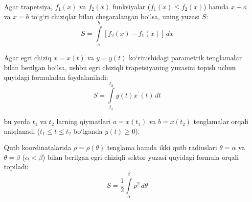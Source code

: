 Agar trapetsiya, $f_1(x)$ va $f_2(x)$ funksiyalar ($f_1(x)\le f_2(x)$) hamda $x+a$ va $x=b$ to`g`ri chiziqlar bilan chegaralangan bo`lsa, uning yuzasi $S$:
$$S=\int\limits_a^b\left[f_2(x)-f_1(x)\right]\,dx$$

Agar egri chiziq $x=x(t)$ va $y=y(t)$ ko`rinishidagi parametrik tenglamalar bilan berilgan bo`lsa, ushbu egri chiziqli trapetsiyaning yuzasini topish uchun quyidagi formuladan foydalaniladi:
$$S=\int\limits_{t_{1}}^{t_{2}}y(t)x^\prime(t)\,dt$$

bu yerda $t_1$ va $t_2$ larning qiymatlari $a=x(t_1)$ va $b=x(t_2)$ tenglamalar orqali aniqlanadi ($t_1\le t\le t_2$ bo`lganda $y(t)\ge0$).

Qutb koordinatalarida $\rho=\rho(\theta)$ tenglama hamda ikki qutb radiuslari $\theta=\alpha$ va $\theta=\beta$ ($\alpha<\beta$) bilan berilgan egri chiziqli sektor yuzasi quyidagi formula orqali topiladi:
$$S=\frac{1}{2}\int\limits_{\alpha}^{\beta}\rho^2\,d\theta$$


